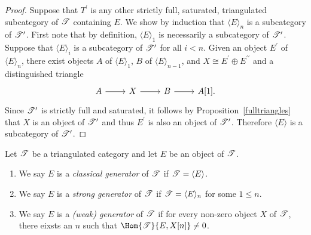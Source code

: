 \documentclass[10pt]{amsart}
\begin{document}
\begin{prop}
\begin{proof}
    Suppose that $T^\prime$ is any other strictly full, saturated, triangulated subcategory of $\mathscr{T}$ containing $E$.
    We show by induction that $\langle E \rangle_n$ is a subcategory of $\mathscr{T}^\prime$.
    First note that by definition, $\langle E \rangle_1$ is necessarily a subcategory of $\mathscr{T}^\prime$.
    Suppose that $\langle E \rangle_i$ is a subcategory of $\mathscr{T}^\prime$ for all $i < n$.
    Given an object $E^\prime$ of $\langle E \rangle_n$, there exist objects $A$ of $\langle E \rangle_1$, $B$ of $\langle E \rangle_{n-1}$, and $X \cong E^\prime \oplus E^{\prime\prime}$ and a distinguished triangle
    $$\begin{tikzcd}
      A \arrow{r} & X \arrow{r} & B \arrow{r} & A[1].
    \end{tikzcd}$$
    Since $\mathscr{T}^\prime$ is strictly full and saturated, it follows by Proposition~\ref{fulltriangles} that $X$ is an object of $\mathscr{T}^\prime$ and thus $E^\prime$ is also an object of $\mathscr{T}^\prime$.
    Therefore $\langle E \rangle$ is a subcategory of $\mathscr{T}^\prime$.
  \end{proof}
\end{prop}

\begin{defn}
  Let $\mathscr{T}$ be a triangulated category and let $E$ be an object of $\mathscr{T}$.
  \begin{enumerate}
  \item
    We say $E$ is a {\it classical generator} of $\mathscr{T}$ if $\mathscr{T} = \langle E \rangle$.
  \item
    We say $E$ is a {\it strong generator} of $\mathscr{T}$ if $\mathscr{T} = \langle E \rangle_n$ for some $1 \leq n$.
  \item
    We say $E$ is a {\it (weak) generator} of $\mathscr{T}$ if for every non-zero object $X$ of $\mathscr{T}$, there eixsts an $n$ such that $\Hom{\T}{E,X[n]} \neq 0$.
  \end{enumerate}
\end{defn}
\end{document}
